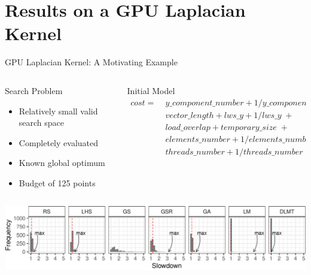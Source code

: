 \documentclass[10pt, compress, aspectratio=169, xcolor={table,usenames,dvipsnames}]{beamer}
\begin{document}
\section{Results on a GPU Laplacian Kernel}
\label{sec:org2d1ab09}
\begin{frame}[label={sec:org9016a93}]{GPU Laplacian Kernel: A Motivating Example}
\begin{columns}
\begin{column}{0.5\columnwidth}
\begin{block}{Search Problem}
\begin{itemize}
\item Relatively \alert{small valid search space}
\item \alert{Completely evaluated}
\item Known \alert{global optimum}
\item \alert{Budget} of \alert{125 points}
\end{itemize}
\end{block}
\end{column}

\begin{column}{0.5\columnwidth}
\begin{block}{Initial Model}
\footnotesize
\begin{align*}
cost = & \; y\_component\_number + 1 / y\_component\_number \; + \\
& \; vector\_length + lws\_y + 1 / lws\_y \; + \\
& \; load\_overlap + temporary\_size \; + \\
& \; elements\_number + 1 / elements\_number \; + \\
& \; threads\_number + 1 / threads\_number
\end{align*}
\normalsize
\end{block}
\end{column}
\end{columns}

\vspace{-.3cm}


\vspace{-.3cm}

\begin{center}
\begin{center}
\includegraphics[width=.88\columnwidth]{../../../img/comparison_histogram.pdf}
\end{center}
\end{center}
\end{frame}
\end{document}
